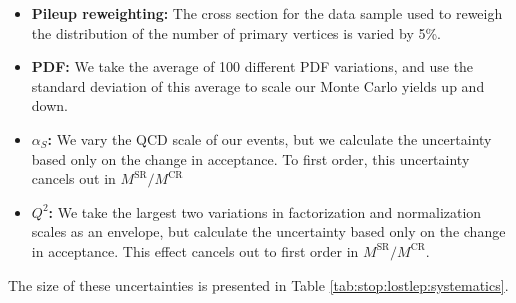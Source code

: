 \begin{itemize}
\item \textbf{Pileup reweighting:} The cross section for the data
  sample used to reweigh the distribution of the number of primary
  vertices is varied by 5\%.
\item \textbf{PDF:} We take the average of 100 different PDF
  variations, and use the standard deviation of this average to scale %
  our Monte Carlo yields up and down.
\item \textbf{$\alpha_S$:} We vary the QCD scale of our events, but we
  calculate the uncertainty based only on the change in acceptance. To
  first order, this uncertainty cancels out in $M^\text{SR} / M^\text{CR}$
\item \textbf{$Q^2$:} We take the largest two variations in
  factorization and normalization scales as an envelope, but calculate
  the uncertainty based only on the change in acceptance. This effect
  cancels out to first order in $M^\text{SR} / M^\text{CR}$. %
\end{itemize}
The size of these uncertainties is presented in Table
\ref{tab:stop:lostlep:systematics}.

